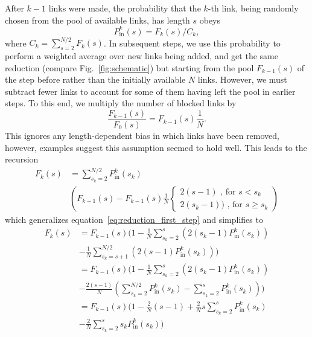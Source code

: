 \documentclass[
reprint,
twocolumn,
amsmath,amssymb,superscriptaddress,aps,
pre]{revtex4-1}
\newcommand{\Pin}{P_{\mathrm{in}}}
\begin{document}
After $k-1$ links were made, the probability that the $k$-th link, being randomly chosen from the pool of available links, has length $s$ obeys
\begin{equation}
    \Pin^k(s)=F_k(s)/C_k,
\end{equation}
where $C_k=\sum_{s=2}^{N/2}F_k(s)$. In subsequent steps, we use this probability to perform a weighted average over new links being added, and get the same reduction (compare Fig.~\ref{fig:schematic}) but starting from the pool $F_{k-1}(s)$ of the step before rather than the initially available $N$ links. However, we must subtract fewer links to account for some of them having left the pool in earlier steps. To this end, we multiply the number of blocked links by
\begin{equation}
    \frac{F_{k-1}(s)}{F_0(s)} = F_{k-1}(s)\frac{1}{N}.
    \label{eq.Pk}
\end{equation}
This ignores any length-dependent bias in which links have been removed, however, examples suggest this assumption seemed to hold well. 
This leads to the recursion
\begin{align}
    F_k(s)&= \sum_{s_k=2}^{N/2} \Pin^k(s_k)\nonumber \\
    & \left(F_{k-1}(s)-  F_{k-1}(s)\frac{1}{N}
    {\begin{cases}
     2(s-1) \text{ , for } s<s_k\\
     2(s_k -1))\text{ , for } s\geq s_k
    \end{cases}} \right)
\end{align}
which generalizes equation~\ref{eq:reduction_first_step} and simplifies to
\begin{align}
   F_k(s)&=F_{k-1}(s)(1-\frac{1}{N} \sum_{s_k=2}^{s} (2 (s_k-1) \Pin^k(s_k))\nonumber \\
   &-\frac{1}{N} \sum_{s_k=s+1}^{N/2} (2 (s-1) \Pin^k(s_k)))\nonumber \\
   &=F_{k-1}(s)(1-\frac{1}{N}
   \sum_{s_k=2}^{s} (2 (s_k-1) \Pin^k(s_k))\nonumber \\
   &-\frac{2 (s-1)}{N} (\sum_{s_k=2}^{N/2} \Pin^k(s_k) - \sum_{s_k=2}^{s} \Pin^k(s_k)))\nonumber \\
   &=F_{k-1}(s)(1-\frac{2}{N} (s-1) 
   +\frac{2}{N} s
   \sum_{s_k=2}^{s}\Pin^k(s_k)\nonumber \\
   &-\frac{2}{N}
   \sum_{s_k=2}^{s} s_k \Pin^k(s_k))
   \label{eq.Fk_rec}
\end{align}
\end{document}
